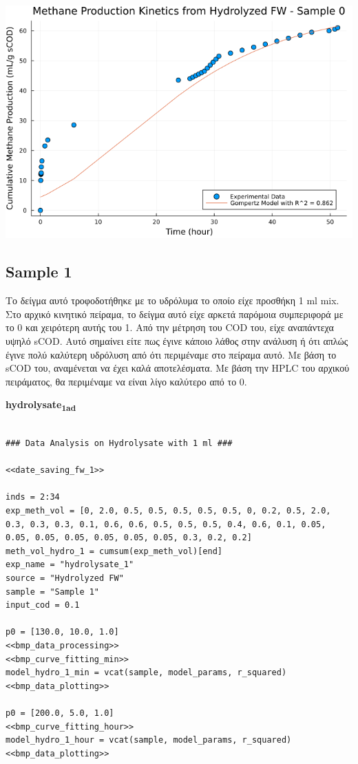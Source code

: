 \documentclass[11pt]{article}
\begin{document}
\begin{center}
\includegraphics[width=.9\linewidth]{../plots/BMPs/Hydrolyzed FW/methane_kinetics_hydrolysate_0_hour.png}
\end{center}

\subsection{Sample 1}
\label{sec:orga410852}
Το δείγμα αυτό τροφοδοτήθηκε με το υδρόλυμα το οποίο είχε προσθήκη 1 ml mix. Στο αρχικό κινητικό πείραμα, το δείγμα αυτό είχε αρκετά παρόμοια συμπεριφορά με το 0 και χειρότερη αυτής του 1. Από την μέτρηση του COD του, είχε αναπάντεχα υψηλό sCOD. Αυτό σημαίνει είτε πως έγινε κάποιο λάθος στην ανάλυση ή ότι απλώς έγινε πολύ καλύτερη υδρόλυση από ότι περιμέναμε στο πείραμα αυτό. Με βάση το sCOD του, αναμένεται να έχει καλά αποτελέσματα. Με βάση την HPLC του αρχικού πειράματος, θα περιμέναμε να είναι λίγο καλύτερο από το 0.

\textbf{hydrolysate\textsubscript{1}\textsubscript{ad}}
\begin{verbatim}

### Data Analysis on Hydrolysate with 1 ml ###

<<date_saving_fw_1>>

inds = 2:34
exp_meth_vol = [0, 2.0, 0.5, 0.5, 0.5, 0.5, 0.5, 0, 0.2, 0.5, 2.0, 0.3, 0.3, 0.3, 0.1, 0.6, 0.6, 0.5, 0.5, 0.5, 0.4, 0.6, 0.1, 0.05, 0.05, 0.05, 0.05, 0.05, 0.05, 0.05, 0.3, 0.2, 0.2]
meth_vol_hydro_1 = cumsum(exp_meth_vol)[end]
exp_name = "hydrolysate_1"
source = "Hydrolyzed FW"
sample = "Sample 1"
input_cod = 0.1

p0 = [130.0, 10.0, 1.0]
<<bmp_data_processing>>
<<bmp_curve_fitting_min>>
model_hydro_1_min = vcat(sample, model_params, r_squared)
<<bmp_data_plotting>>

p0 = [200.0, 5.0, 1.0]
<<bmp_curve_fitting_hour>>
model_hydro_1_hour = vcat(sample, model_params, r_squared)
<<bmp_data_plotting>>
\end{verbatim}
\end{document}
